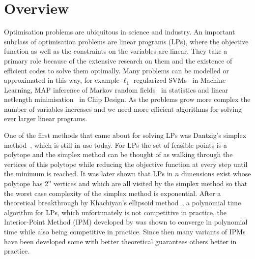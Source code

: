 \chapter{Overview}\label{chap:introduction}

Optimisation problems are ubiquitous in science and industry.
An important subclass of optimisation problems are linear programs (LPs), where the objective function as well as the constraints on the variables are linear.
They take a primary role because of the extensive research on them and the existence of efficient codes to solve them optimally.
Many problems can be modelled or approximated in this way, for example \(\ell_1\)-regularized SVMs~\cite{ZhuRossetTibshiraniHastie-1normSupportVectorMachines} in Machine Learning, MAP inference of Markov random fields~\cite{MeshiGloberson-MapLpRelaxation} in statistics and linear netlength minimisation~\cite{BrennerVygen-AnalyticalMethodsInVlsiPlacement} in Chip Design.
As the problems grow more complex the number of variables increases and we need more efficient algorithms for solving ever larger linear programs.

One of the first methods that came about for solving LPs was Dantzig's simplex method~\cite{Dantzig-Simplex}, which is still in use today.
For LPs the set of feasible points is a polytope and the simplex method can be thought of as walking through the vertices of this polytope while reducing the objective function at every step until the minimum is reached.
It was later shown that LPs in \(n\) dimensions exist whose polytope has \(2^n\) vertices and which are all visited by the simplex method so that the worst case complexity of the simplex method is exponential.
After a theoretical breakthrough by Khachiyan's ellipsoid method~\cite{Khachiyan-Ellipsoid1,Khachiyan-Ellipsoid2}, a polynomial time algorithm for LPs, which unfortunately is not competitive in practice, the Interior-Point Method (IPM) developed by \textcite{Karmarkar-IPM} was shown to converge in polynomial time while also being competitive in practice.
Since then many variants of IPMs have been developed some with better theoretical guarantees others better in practice.

